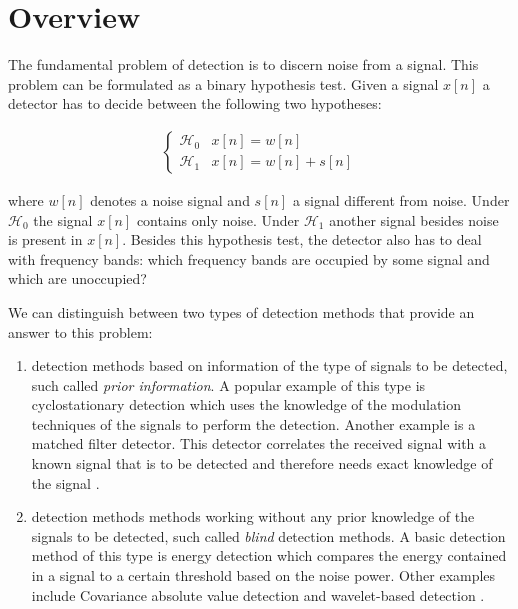 \documentclass[a4paper, openany, oneside]{memoir}
\begin{document}
\section{Overview}
The fundamental problem of detection is to discern noise from a signal. This problem can be formulated as a binary hypothesis test. Given a signal $x[n]$ a detector has to decide between the following two hypotheses:

\begin{align*}
	\begin{cases}
		\mathcal{H}_0 & x[n] = w[n] \\
		\mathcal{H}_1 & x[n] = w[n] + s[n]
	\end{cases}
\end{align*}

where $w[n]$ denotes a noise signal and $s[n]$ a signal different from noise. Under $\mathcal{H}_0$ the signal $x[n]$ contains only noise. Under $\mathcal{H}_1$ another signal besides noise is present in $x[n]$. Besides this hypothesis test, the detector also has to deal with frequency bands: which frequency bands are occupied by some signal and which are unoccupied?

We can distinguish between two types of detection methods that provide an answer to this problem:
\begin{enumerate}
\item detection methods based on information of the type of signals to be detected, such called \emph{prior information}.
A popular example of this type is cyclostationary detection which uses the knowledge of the modulation techniques of the signals to perform the detection\cite{axell2012spectrum,quan2009optimal}. Another example is a matched filter detector. This detector correlates the received signal with a known signal that is to be detected and therefore needs exact knowledge of the signal \cite{Kapoor2011Communication}\cite{couch2013digital}. 
\item detection methods methods working without any prior knowledge of the signals to be detected, such called \emph{blind} detection methods.
A basic detection method of this type is energy detection \cite{axell2012spectrum} which compares the energy contained in a signal to a certain threshold based on the noise power. Other examples include Covariance absolute value detection \cite{zheng2009spectrum} and wavelet-based detection \cite{han2013novel}. 
\end{enumerate}
\end{document}
